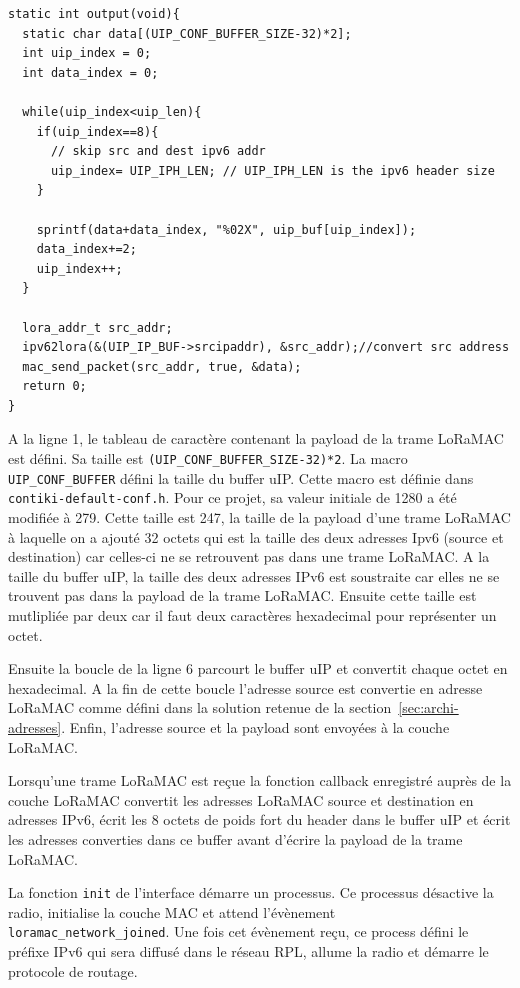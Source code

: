     \begin{verbatim}
static int output(void){ 
  static char data[(UIP_CONF_BUFFER_SIZE-32)*2];
  int uip_index = 0;
  int data_index = 0;
  
  while(uip_index<uip_len){
    if(uip_index==8){
      // skip src and dest ipv6 addr
      uip_index= UIP_IPH_LEN; // UIP_IPH_LEN is the ipv6 header size
    }

    sprintf(data+data_index, "%02X", uip_buf[uip_index]);
    data_index+=2;
    uip_index++;
  }

  lora_addr_t src_addr;
  ipv62lora(&(UIP_IP_BUF->srcipaddr), &src_addr);//convert src address
  mac_send_packet(src_addr, true, &data);
  return 0;
}
    \end{verbatim}
    A la ligne 1, le tableau de caractère contenant la payload de la trame LoRaMAC est défini. Sa 
    taille est \texttt{(UIP\_CONF\_BUFFER\_SIZE-32)*2}. La macro \texttt{UIP\_CONF\_BUFFER} défini 
    la taille du buffer uIP. Cette macro est définie dans \texttt{contiki-default-conf.h}. Pour ce 
    projet, sa valeur initiale de 1280 a été modifiée à 279. Cette taille est 247, la 
    taille de la payload d'une trame LoRaMAC à laquelle on a ajouté 32 octets qui est la taille des 
    deux adresses Ipv6 (source et destination) car celles-ci ne se retrouvent pas dans une trame LoRaMAC.
    A la taille du buffer uIP, la taille des deux adresses IPv6 est soustraite car elles ne se 
    trouvent pas dans la payload de la trame LoRaMAC. Ensuite cette taille est mutlipliée par deux 
    car il faut deux caractères hexadecimal pour représenter un octet.

    Ensuite la boucle de la ligne 6 parcourt le buffer uIP et convertit chaque octet en hexadecimal.
    A la fin de cette boucle l'adresse source est convertie en adresse LoRaMAC comme défini dans la solution retenue de la section~\ref{sec:archi-adresses}. Enfin, l'adresse source et la payload sont envoyées à la couche LoRaMAC.

    Lorsqu'une trame LoRaMAC est reçue la fonction callback enregistré auprès de la couche LoRaMAC 
    convertit les adresses LoRaMAC source et destination en adresses IPv6, écrit les 8 
    octets de poids fort du header dans le buffer uIP et écrit les adresses converties dans ce buffer avant d'écrire la payload de la trame LoRaMAC.

    La fonction \texttt{init} de l'interface démarre un processus. Ce processus désactive la radio, 
    initialise la couche MAC et attend l'évènement\\ \texttt{loramac\_network\_joined}. Une fois cet 
    évènement reçu, ce process défini le préfixe IPv6 qui sera diffusé dans le réseau RPL, allume 
    la radio et démarre le protocole de routage.

